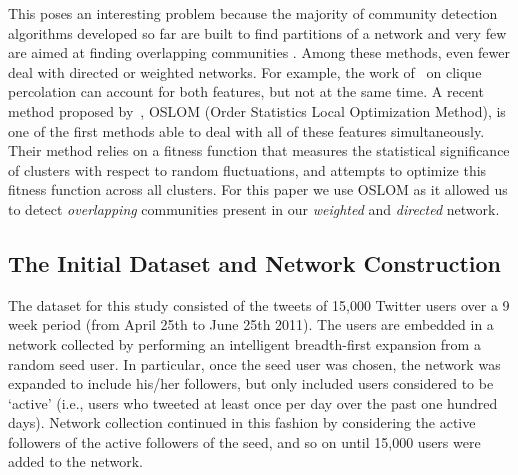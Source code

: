 This poses an interesting problem because the majority of community detection algorithms developed so far are built to find partitions of a network and very few are aimed at finding overlapping communities \cite{BaumesGKMP05,PalEtAl05,ZhaWanZha07,Gre07,PhysRevE.77.016107,Lancichinetti2009,PhysRevE.80.016105,Kovacs2010}. Among these methods, even fewer deal with directed or weighted networks. For example, the work of~\cite{PalEtAl05} on clique percolation can account for both features, but not at the same time. A recent method proposed by~\cite{LancichinettiPlos}, OSLOM (Order Statistics Local Optimization Method), is one of the first methods  able to deal with all of these features simultaneously. Their method relies on a fitness function that measures the statistical significance of clusters with respect to random fluctuations, and attempts to optimize this fitness function across all clusters. For this paper we use OSLOM as it allowed us to detect \emph{overlapping} communities present in our \emph{weighted} and \emph{directed} network.

\subsection{The Initial Dataset and Network Construction}

The dataset for this study consisted of the tweets of 15,000 Twitter users over a 9 week period (from April 25th to June 25th 2011). The users are embedded in a network collected by performing an intelligent breadth-first expansion from a random seed user. In particular, once the seed user was chosen, the network was expanded to include his/her followers, but only included users considered to be `active' (i.e., users who tweeted at least once per day over the past one hundred days). Network collection continued in this fashion by considering the active followers of the active followers of the seed, and so on until 15,000 users were added to the network.

